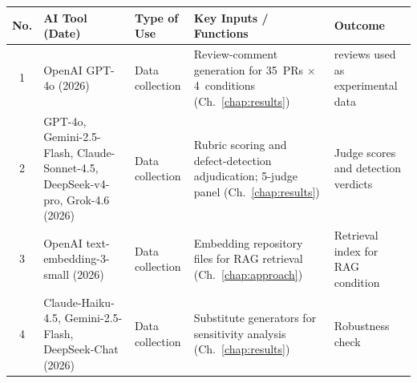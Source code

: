\noindent
\small
\begin{longtable}{@{}c >{\raggedright}p{3.4cm} p{2.0cm} >{\raggedright}p{4.2cm} >{\raggedright\arraybackslash}p{3.8cm}@{}}
\toprule
\textbf{No.} & \textbf{AI Tool (Date)} & \textbf{Type of Use} &
\textbf{Key Inputs / Functions} &
\textbf{Outcome} \\
\midrule
\endhead
1 & OpenAI GPT-4o (2026) &
    Data collection &
    Review-comment generation for 35~PRs $\times$ 4~conditions
    (Ch.~\ref{chap:results}) &
    140 reviews used as experimental data \\[6pt]
2 & GPT-4o, Gemini-2.5-Flash, Claude-Sonnet-4.5, DeepSeek-v4-pro, Grok-4.6 (2026) &
    Data collection &
    Rubric scoring and defect-detection adjudication; 5-judge panel
    (Ch.~\ref{chap:results}) &
    Judge scores and detection verdicts \\[6pt]
3 & OpenAI text-embedding-3-small (2026) &
    Data collection &
    Embedding repository files for RAG retrieval
    (Ch.~\ref{chap:approach}) &
    Retrieval index for RAG condition \\[6pt]
4 & Claude-Haiku-4.5, Gemini-2.5-Flash, DeepSeek-Chat (2026) &
    Data collection &
    Substitute generators for sensitivity analysis
    (Ch.~\ref{chap:results}) &
    Robustness check \\[6pt]
\bottomrule
\end{longtable}
